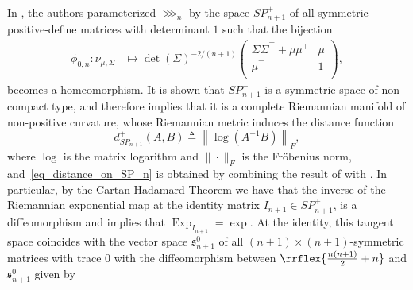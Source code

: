 In \cite{GeometryOfMultivariateNormal_Lie_Canada}, the authors parameterized $\ggg_n$ by the space $SP_{n+1}^+$ of all symmetric positive-define matrices with determinant $1$ such that the bijection
$$
\begin{aligned}
\phi_{0,n}: 
\nu_{\mu,\Sigma} & \mapsto \det(\Sigma)^{-2/(n+1)}
\begin{pmatrix}
\Sigma\Sigma^{\top} + \mu\mu^{\top} & \mu\\
\mu^{\top} & 1\\
\end{pmatrix}
,
\end{aligned}
$$
becomes a homeomorphism.  
It is shown that $SP_{n+1}^+$ is a symmetric space of non-compact type, and therefore \citep[]{Helgason2008} implies that it is a complete Riemannian manifold of non-positive curvature, whose Riemannian metric induces the distance function
\begin{equation}
    d_{SP_{n+1}}^+(A,B) 
    \triangleq
    \left\|
     \log\left(
     A^{-1}B
    \right)
    \right\|_F
    \label{eq_distance_on_SP_n}
    ,
\end{equation}
where $\log$ is the matrix logarithm and $\|\cdot\|_F$ is the Fr\"{o}benius norm, and~\eqref{eq_distance_on_SP_n} is obtained by combining the result of \citep[page 43]{GeometryOfMultivariateNormal_Lie_Canada} with \citep[Equation 2.9]{MoakerMaherSPDIntrinsicMeans}.  
%
In particular, by the Cartan-Hadamard Theorem we have that the inverse of the Riemannian exponential map at the identity matrix $I_{n+1}\in SP_{n+1}^+$, is a diffeomorphism and \citep[]{Helgason2008} implies that $\operatorname{Exp}_{I_{n+1}}=\exp$.  At the identity, this tangent space coincides with the vector space $\mathfrak{s}_{n+1}^0$ of all $(n+1)\times (n+1)$-symmetric matrices with trace $0$ with the diffeomorphism between $\rrflex{\frac{n(n+1)}{2}+n}$ and $\mathfrak{s}_{n+1}^0$ given by
